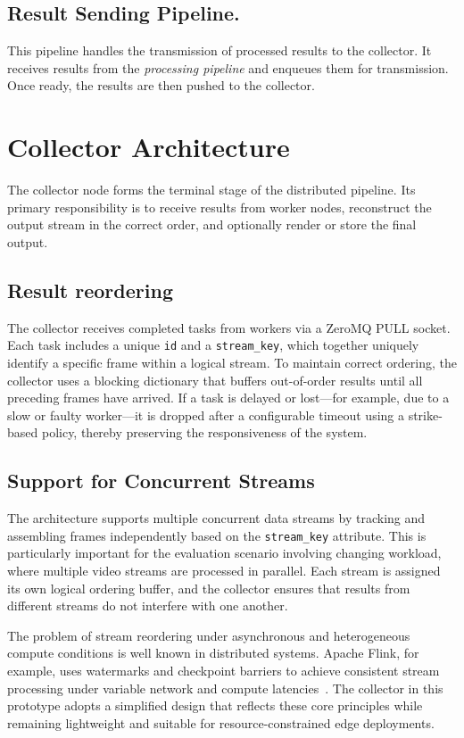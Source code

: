 \subsection{Result Sending Pipeline.}
This pipeline handles the transmission of processed results to the collector. It receives results from the \textit{processing pipeline} and enqueues them for transmission. Once ready, the results are then pushed to the collector.

\section{Collector Architecture}
The collector node forms the terminal stage of the distributed pipeline. Its primary responsibility is to receive results from worker nodes, reconstruct the output stream in the correct order, and optionally render or store the final output. 


\subsection{Result reordering}
The collector receives completed tasks from workers via a ZeroMQ PULL socket. Each task includes a unique \texttt{id} and a \texttt{stream\_key}, which together uniquely identify a specific frame within a logical stream. To maintain correct ordering, the collector uses a blocking dictionary that buffers out-of-order results until all preceding frames have arrived. If a task is delayed or lost—for example, due to a slow or faulty worker—it is dropped after a configurable timeout using a strike-based policy, thereby preserving the responsiveness of the system.

\subsection{Support for Concurrent Streams}
The architecture supports multiple concurrent data streams by tracking and assembling frames independently based on the \texttt{stream\_key} attribute. This is particularly important for the evaluation scenario involving changing workload, where multiple video streams are processed in parallel. Each stream is assigned its own logical ordering buffer, and the collector ensures that results from different streams do not interfere with one another.

The problem of stream reordering under asynchronous and heterogeneous compute conditions is well known in distributed systems. Apache Flink, for example, uses watermarks and checkpoint barriers to achieve consistent stream processing under variable network and compute latencies~\cite{carbone_apache_2015}. The collector in this prototype adopts a simplified design that reflects these core principles while remaining lightweight and suitable for resource-constrained edge deployments.
